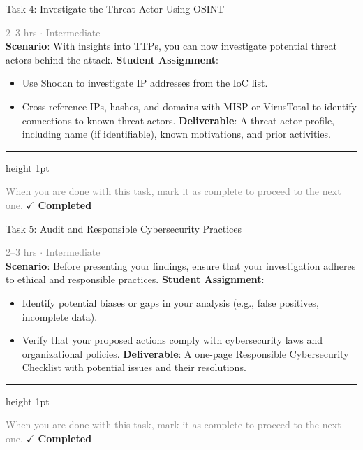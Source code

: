 \documentclass[10pt,a4paper]{article}
\begin{document}
\begin{taskbox}{Task 4: Investigate the Threat Actor Using OSINT}

    {\small \textcolor{gray}{2--3 hrs $\cdot$ Intermediate}}\\[12pt]

    \textbf{Scenario}: With insights into TTPs, you can now investigate potential threat actors behind the attack.  
\textbf{Student Assignment}:  
\begin{itemize}
    \item Use Shodan to investigate IP addresses from the IoC list.  
    \item Cross-reference IPs, hashes, and domains with MISP or VirusTotal to identify connections to known threat actors.  
\textbf{Deliverable}: A threat actor profile, including name (if identifiable), known motivations, and prior activities.\par
\end{itemize}

    \vspace{16pt}

    \textcolor{cardBorder}{\hrule height 1pt}\vspace{8pt}

    \small \textcolor{gray}{When you are done with this task, mark it as complete to proceed to the next one.} \hfill \textbf{\textcolor{brandDark}{$\checkmark$ Completed}}

\end{taskbox}

\begin{taskbox}{Task 5: Audit and Responsible Cybersecurity Practices}

    {\small \textcolor{gray}{2--3 hrs $\cdot$ Intermediate}}\\[12pt]

    \textbf{Scenario}: Before presenting your findings, ensure that your investigation adheres to ethical and responsible practices.  
\textbf{Student Assignment}:  
\begin{itemize}
    \item Identify potential biases or gaps in your analysis (e.g., false positives, incomplete data).  
    \item Verify that your proposed actions comply with cybersecurity laws and organizational policies.  
\textbf{Deliverable}: A one-page Responsible Cybersecurity Checklist with potential issues and their resolutions.\par
\end{itemize}

    \vspace{16pt}

    \textcolor{cardBorder}{\hrule height 1pt}\vspace{8pt}

    \small \textcolor{gray}{When you are done with this task, mark it as complete to proceed to the next one.} \hfill \textbf{\textcolor{brandDark}{$\checkmark$ Completed}}

\end{taskbox}
\end{document}

